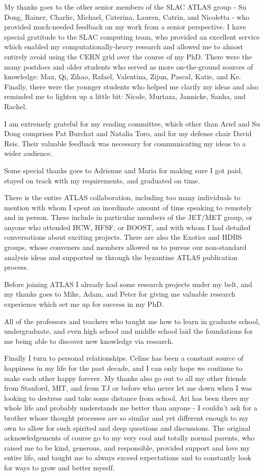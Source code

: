My thanks goes to the other senior members of the SLAC ATLAS group - Su Dong, Rainer, Charlie, Michael, Caterina, Lauren, Catrin, and Nicoletta - who provided much-needed feedback on my work from a senior perspective.
I have special gratitude to the SLAC computing team, who provided an excellent service which enabled my computationally-heavy research and allowed me to almost entirely avoid using the CERN grid over the course of my PhD.
There were the many postdocs and older students who served as more on-the-ground sources of knowledge: Max, Qi, Zihao, Rafael, Valentina, Zijun, Pascal, Katie, and Ke.
Finally, there were the younger students who helped me clarify my ideas and also reminded me to lighten up a little bit: Nicole, Murtaza, Jannicke, Sanha, and Rachel.

I am extremely grateful for my reading committee, which other than Ariel and Su Dong comprises Pat Burchat and Natalia Toro, and for my defense chair David Reis.
Their valuable feedback was necessary for communicating my ideas to a wider audience.

Some special thanks goes to Adrienne and Maria for making sure I got paid, stayed on track with my requirements, and graduated on time.

There is the entire ATLAS collaboration, including too many individuals to mention with whom I spent an inordinate amount of time speaking to remotely and in person.
These include in particular members of the JET/MET group, or anyone who attended HCW, HFSF, or BOOST, and with whom I had detailed conversations about exciting projects. 
There are also the Exotics and HDBS groups, whose conveners and members allowed us to pursue our non-standard analysis ideas and supported us through the byzantine ATLAS publication process.

Before joining ATLAS I already had some research projects under my belt, and my thanks goes to Mike, Adam, and Peter for giving me valuable research experience which set me up for success in my PhD.

All of the professors and teachers who taught me how to learn in graduate school, undergraduate, and even high school and middle school laid the foundations for me being able to discover new knowledge via research.

Finally I turn to personal relationships.
Celine has been a constant source of happiness in my life for the past decade, and I can only hope we continue to make each other happy forever.
My thanks also go out to all my other friends from Stanford, MIT, and from TJ or before who never let me down when I was looking to destress and take some distance from school.
Ari has been there my whole life and probably understands me better than anyone - I couldn't ask for a brother whose thought processes are so similar and yet different enough to my own to allow for such spirited and deep questions and discussions.
The original acknowledgements of course go to my very cool and totally normal parents, who raised me to be kind, generous, and responsible, provided support and love my entire life, and taught me to always exceed expectations and to constantly look for ways to grow and better myself.
